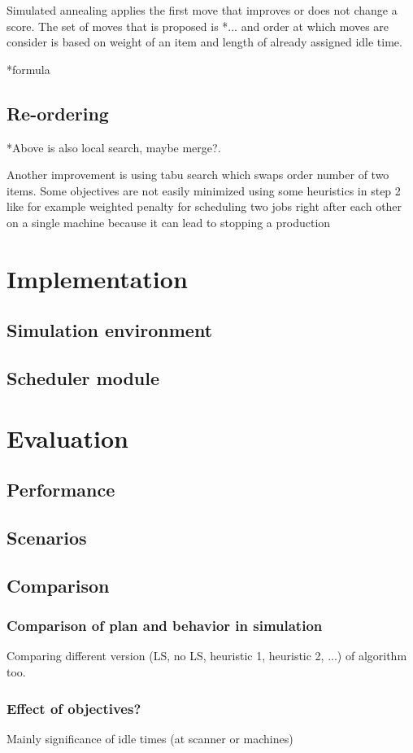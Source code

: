 \documentclass{ctuthesis}
\begin{document}
Simulated annealing applies the first move that improves or does not change a score. The set of moves that is proposed is *... and order at which moves are consider is based on weight of an item and length of already assigned idle time. 

*formula

\section{Re-ordering}
*Above is also local search, maybe merge?.

Another improvement is using tabu search which swaps order number of two items. Some objectives are not easily minimized using some heuristics in step 2 like for example weighted penalty for scheduling two jobs right after each other on a single machine because it can lead to stopping a production

\chapter{Implementation}
\section{Simulation environment}
\section{Scheduler module}
\chapter{Evaluation}
\label{ch:Evaluation}
\section{Performance}
\section{Scenarios}
\section{Comparison}
\subsection{Comparison of plan and behavior in simulation}
Comparing different version (LS, no LS, heuristic 1, heuristic 2, ...) of algorithm too.
\subsection{Effect of objectives?}
Mainly significance of idle times (at scanner or machines)
\end{document}
